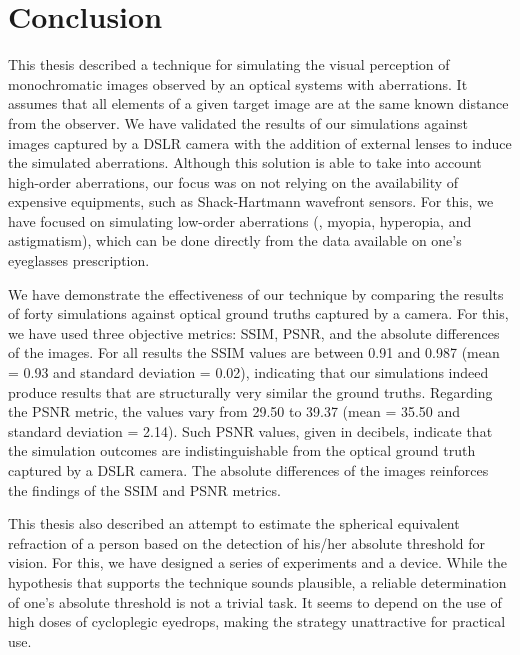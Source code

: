 
\chapter{Conclusion}
\label{chap:Discussion}

This thesis described a technique for simulating the visual perception of monochromatic images observed by an optical systems with aberrations. It assumes that all elements of a given target image are at the same known distance from the observer. 
We have validated the results of our simulations against images captured by a DSLR camera with the addition of external lenses to induce the simulated aberrations. 
Although this solution is able to take into account high-order aberrations, our focus was on not relying on the availability of expensive equipments, such as Shack-Hartmann wavefront sensors. 
For this, we have focused on simulating low-order aberrations (\ie, myopia, hyperopia, and astigmatism), which can be done directly from the data available on one's eyeglasses prescription.  

We have demonstrate the effectiveness of our technique by comparing the results of forty simulations against optical ground truths captured by a camera. For this, we have used three objective metrics: SSIM, PSNR, and the absolute differences of the images. 
For all results the SSIM values are between 0.91 and 0.987 (mean = 0.93 and standard deviation = 0.02), indicating that our simulations indeed produce results that are structurally very similar the ground truths. Regarding the PSNR metric, the values vary from 29.50 to 39.37 (mean = 35.50 and standard deviation = 2.14). Such PSNR values, given in decibels, indicate that the simulation outcomes are indistinguishable from the optical ground truth captured by a DSLR camera. The absolute differences of the images reinforces the findings of the SSIM and PSNR metrics.

This thesis also described an attempt to estimate the spherical equivalent refraction of a person based on the detection of his/her absolute threshold for vision. For this, we have designed a series of experiments and a device. While the hypothesis that supports the technique sounds plausible, a reliable determination of one's absolute threshold is not a trivial task. It seems to depend on the use of high doses of cycloplegic eyedrops, making the strategy unattractive for practical use. 

